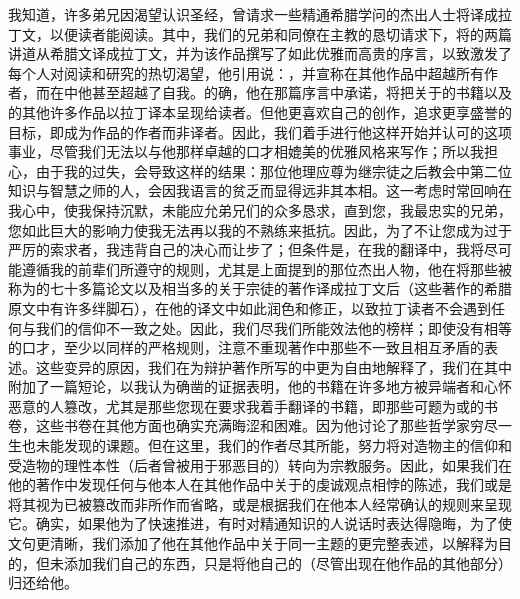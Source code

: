 我知道，许多弟兄因渴望认识圣经，曾请求一些精通希腊学问的杰出人士将译成拉丁文，以便读者能阅读。其中，我们的兄弟和同僚在主教的恳切请求下，将的两篇讲道从希腊文译成拉丁文，并为该作品撰写了如此优雅而高贵的序言，以致激发了每个人对阅读和研究的热切渴望，他引用说：，并宣称在其他作品中超越所有作者，而在中他甚至超越了自我。的确，他在那篇序言中承诺，将把关于的书籍以及的其他许多作品以拉丁译本呈现给读者。但他更喜欢自己的创作，追求更享盛誉的目标，即成为作品的作者而非译者。因此，我们着手进行他这样开始并认可的这项事业，尽管我们无法以与他那样卓越的口才相媲美的优雅风格来写作；所以我担心，由于我的过失，会导致这样的结果：那位他理应尊为继宗徒之后教会中第二位知识与智慧之师的人，会因我语言的贫乏而显得远非其本相。这一考虑时常回响在我心中，使我保持沉默，未能应允弟兄们的众多恳求，直到您，我最忠实的兄弟，您如此巨大的影响力使我无法再以我的不熟练来抵抗。因此，为了不让您成为过于严厉的索求者，我违背自己的决心而让步了；但条件是，在我的翻译中，我将尽可能遵循我的前辈们所遵守的规则，尤其是上面提到的那位杰出人物，他在将那些被称为的七十多篇论文以及相当多的关于宗徒的著作译成拉丁文后（这些著作的希腊原文中有许多绊脚石），在他的译文中如此润色和修正，以致拉丁读者不会遇到任何与我们的信仰不一致之处。因此，我们尽我们所能效法他的榜样；即使没有相等的口才，至少以同样的严格规则，注意不重现著作中那些不一致且相互矛盾的表述。这些变异的原因，我们在为辩护著作所写的中更为自由地解释了，我们在其中附加了一篇短论，以我认为确凿的证据表明，他的书籍在许多地方被异端者和心怀恶意的人篡改，尤其是那些您现在要求我着手翻译的书籍，即那些可题为或的书卷，这些书卷在其他方面也确实充满晦涩和困难。因为他讨论了那些哲学家穷尽一生也未能发现的课题。但在这里，我们的作者尽其所能，努力将对造物主的信仰和受造物的理性本性（后者曾被用于邪恶目的）转向为宗教服务。因此，如果我们在他的著作中发现任何与他本人在其他作品中关于的虔诚观点相悖的陈述，我们或是将其视为已被篡改而非所作而省略，或是根据我们在他本人经常确认的规则来呈现它。确实，如果他为了快速推进，有时对精通知识的人说话时表达得隐晦，为了使文句更清晰，我们添加了他在其他作品中关于同一主题的更完整表述，以解释为目的，但未添加我们自己的东西，只是将他自己的（尽管出现在他作品的其他部分）归还给他。\par

